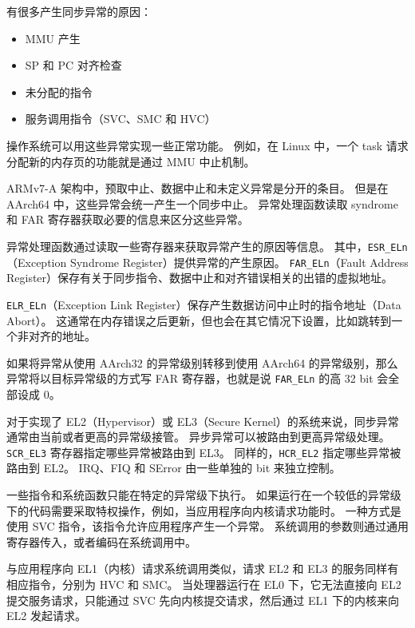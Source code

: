 
有很多产生同步异常的原因：

\begin{itemize}
  \item MMU 产生
  \item SP 和 PC 对齐检查
  \item 未分配的指令
  \item 服务调用指令（SVC、SMC 和 HVC）
\end{itemize}

操作系统可以用这些异常实现一些正常功能。
例如，在 Linux 中，一个 task 请求分配新的内存页的功能就是通过 MMU 中止机制。

ARMv7-A 架构中，预取中止、数据中止和未定义异常是分开的条目。
但是在 AArch64 中，这些异常会统一产生一个同步中止。
异常处理函数读取 syndrome 和 FAR 寄存器获取必要的信息来区分这些异常。


异常处理函数通过读取一些寄存器来获取异常产生的原因等信息。
其中，\lstinline!ESR_ELn!（Exception Syndrome Register）提供异常的产生原因。
\lstinline!FAR_ELn!（Fault Address Register）保存有关于同步指令、数据中止和对齐错误相关的出错的虚拟地址。

\lstinline!ELR_ELn!（Exception Link Register）保存产生数据访问中止时的指令地址（Data Abort）。
这通常在内存错误之后更新，但也会在其它情况下设置，比如跳转到一个非对齐的地址。

如果将异常从使用 AArch32 的异常级别转移到使用 AArch64 的异常级别，那么异常将以目标异常级的方式写 FAR 寄存器，也就是说 \lstinline!FAR_ELn! 的高 32 bit 会全部设成 0。

对于实现了 EL2（Hypervisor）或 EL3（Secure Kernel）的系统来说，同步异常通常由当前或者更高的异常级接管。
异步异常可以被路由到更高异常级处理。
\lstinline!SCR_EL3! 寄存器指定哪些异常被路由到 EL3。
同样的，\lstinline!HCR_EL2! 指定哪些异常被路由到 EL2。
IRQ、FIQ 和 SError 由一些单独的 bit 来独立控制。


一些指令和系统函数只能在特定的异常级下执行。
如果运行在一个较低的异常级下的代码需要采取特权操作，例如，当应用程序向内核请求功能时。
一种方式是使用 SVC 指令，该指令允许应用程序产生一个异常。
系统调用的参数则通过通用寄存器传入，或者编码在系统调用中。


与应用程序向 EL1（内核）请求系统调用类似，请求 EL2 和 EL3 的服务同样有相应指令，分别为 HVC 和 SMC。
当处理器运行在 EL0 下，它无法直接向 EL2 提交服务请求，只能通过 SVC 先向内核提交请求，然后通过 EL1 下的内核来向 EL2 发起请求。

